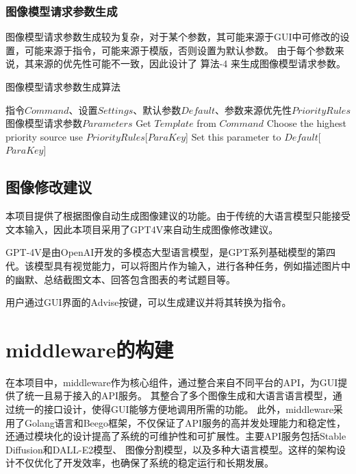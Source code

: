 \documentclass[a4paper,AutoFakeBold,oneside,12pt]{book}
\begin{document}
\subsection{图像模型请求参数生成}
图像模型请求参数生成较为复杂，对于某个参数，其可能来源于GUI中可修改的设置，可能来源于指令，可能来源于模版，否则设置为默认参数。
由于每个参数来说，其来源的优先性可能不一致，因此设计了 算法-4 来生成图像模型请求参数。
\begin{algorithm} 
	\begin{spacing}{1.3}
		\caption{图像模型请求参数生成算法} 
		\label{ImageParasGenAlgorithm}
		\renewcommand{\algorithmicrequire}{\textbf{输入：}}
		\renewcommand{\algorithmicensure}{\textbf{输出：}} 
			\begin{algorithmic}[1] 
				\Require 指令$Command$、设置$Settings$、默认参数$Default$、参数来源优先性$PriorityRules$
				\Ensure 图像模型请求参数$Parameters$
                    \State Get $Template$ from $Command$
                        \State Choose the highest priority source use $PriorityRules$[$ParaKey$]
                    \Else
                        \State Set this parameter to $Default$[$ParaKey$]
                    \EndIf
                \EndFor
			\end{algorithmic}
	\end{spacing}
\end{algorithm}

\section{图像修改建议}
本项目提供了根据图像自动生成图像建议的功能。由于传统的大语言模型只能接受文本输入，因此本项目采用了GPT4V来自动生成图像修改建议。

GPT-4V是由OpenAI开发的多模态大型语言模型，是GPT系列基础模型的第四代。该模型具有视觉能力，可以将图片作为输入，进行各种任务，例如描述图片中的幽默、总结截图文本、回答包含图表的考试题目等。

用户通过GUI界面的Advise按键，可以生成建议并将其转换为指令。

\chapter{middleware的构建} %
在本项目中，middleware作为核心组件，通过整合来自不同平台的API，为GUI提供了统一且易于接入的API服务。
其整合了多个图像生成和大语言语言模型，通过统一的接口设计，使得GUI能够方便地调用所需的功能。
此外，middleware采用了Golang语言和Beego框架，不仅保证了API服务的高并发处理能力和稳定性，
还通过模块化的设计提高了系统的可维护性和可扩展性。主要API服务包括Stable Diffusion和DALL-E2模型、
图像分割模型，以及多种大语言模型。这样的架构设计不仅优化了开发效率，也确保了系统的稳定运行和长期发展。
\end{document}
